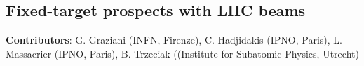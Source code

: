 \documentclass[../report.tex]{subfiles}
\providecommand{\main}{..}
\begin{document}







\clearpage
\subsection{Fixed-target prospects with LHC beams}
\label{sec:fixedtarget}
{ \small
\noindent \textbf{Contributors}: G. Graziani (INFN, Firenze), C. Hadjidakis (IPNO, Paris), L. Massacrier (IPNO, Paris), B. Trzeciak ((Institute for Subatomic Physics, Utrecht)
}
\end{document}
